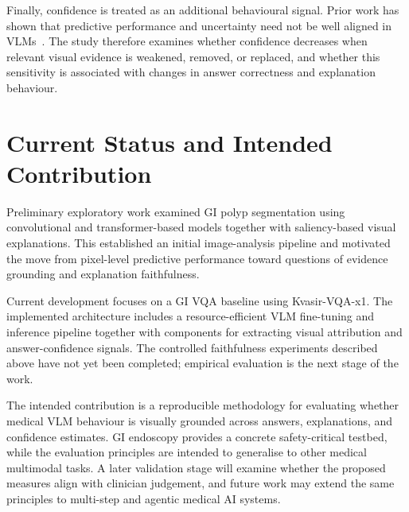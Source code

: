 \documentclass[letterpaper]{article}
\begin{document}
Finally, confidence is treated as an additional behavioural signal. Prior work has shown that predictive performance and uncertainty need not be well aligned in VLMs~\cite{kostumov2024uncertainty}. The study therefore examines whether confidence decreases when relevant visual evidence is weakened, removed, or replaced, and whether this sensitivity is associated with changes in answer correctness and explanation behaviour.

\section{Current Status and Intended Contribution}

Preliminary exploratory work examined GI polyp segmentation using convolutional and transformer-based models together with saliency-based visual explanations. This established an initial image-analysis pipeline and motivated the move from pixel-level predictive performance toward questions of evidence grounding and explanation faithfulness.

Current development focuses on a GI VQA baseline using Kvasir-VQA-x1. The implemented architecture includes a resource-efficient VLM fine-tuning and inference pipeline together with components for extracting visual attribution and answer-confidence signals. The controlled faithfulness experiments described above have not yet been completed; empirical evaluation is the next stage of the work.

The intended contribution is a reproducible methodology for evaluating whether medical VLM behaviour is visually grounded across answers, explanations, and confidence estimates. GI endoscopy provides a concrete safety-critical testbed, while the evaluation principles are intended to generalise to other medical multimodal tasks. A later validation stage will examine whether the proposed measures align with clinician judgement, and future work may extend the same principles to multi-step and agentic medical AI systems.


\end{document}
